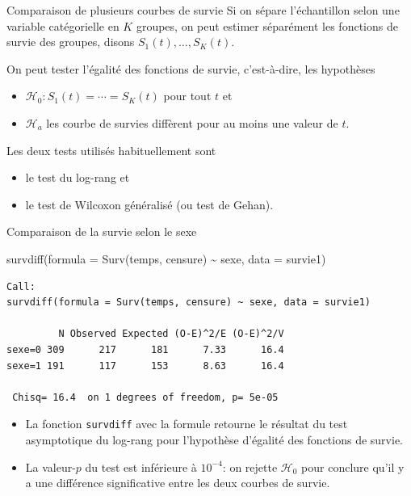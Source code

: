 \documentclass[
  ignorenonframetext,
]{beamer}
\newenvironment{Shaded}{\begin{snugshade}}{\end{snugshade}}
\newcommand{\AttributeTok}[1]{\textcolor[rgb]{0.40,0.45,0.13}{#1}}
\newcommand{\FunctionTok}[1]{\textcolor[rgb]{0.28,0.35,0.67}{#1}}
\newcommand{\NormalTok}[1]{\textcolor[rgb]{0.00,0.23,0.31}{#1}}
\newcommand{\SpecialCharTok}[1]{\textcolor[rgb]{0.37,0.37,0.37}{#1}}
\providecommand{\tightlist}{%
  \setlength{\itemsep}{0pt}\setlength{\parskip}{0pt}}\usepackage{longtable,booktabs,array}
\begin{document}
\begin{frame}{Comparaison de plusieurs courbes de survie}
\protect\hypertarget{comparaison-de-plusieurs-courbes-de-survie}{}
Si on sépare l'échantillon selon une variable catégorielle en \(K\)
groupes, on peut estimer séparément les fonctions de survie des groupes,
disons \(S_1(t), \ldots, S_K(t)\).

On peut tester l'égalité des fonctions de survie, c'est-à-dire, les
hypothèses

\begin{itemize}
\tightlist
\item
  \(\mathscr{H}_0: S_1(t) = \cdots = S_K(t)\) pour tout \(t\) et
\item
  \(\mathscr{H}_a\) les courbe de survies diffèrent pour au moins une
  valeur de \(t\).
\end{itemize}

Les deux tests utilisés habituellement sont

\begin{itemize}
\tightlist
\item
  le test du log-rang et
\item
  le test de Wilcoxon généralisé (ou test de Gehan).
\end{itemize}
\end{frame}

\begin{frame}[fragile]{Comparaison de la survie selon le sexe}
\protect\hypertarget{comparaison-de-la-survie-selon-le-sexe}{}
\begin{Shaded}
\begin{Highlighting}[numbers=left,,]
\FunctionTok{survdiff}\NormalTok{(}\AttributeTok{formula =} \FunctionTok{Surv}\NormalTok{(temps, censure) }\SpecialCharTok{\textasciitilde{}}\NormalTok{ sexe, }
         \AttributeTok{data =}\NormalTok{ survie1)}
\end{Highlighting}
\end{Shaded}

\begin{verbatim}
Call:
survdiff(formula = Surv(temps, censure) ~ sexe, data = survie1)

         N Observed Expected (O-E)^2/E (O-E)^2/V
sexe=0 309      217      181      7.33      16.4
sexe=1 191      117      153      8.63      16.4

 Chisq= 16.4  on 1 degrees of freedom, p= 5e-05 
\end{verbatim}

\begin{itemize}
\tightlist
\item
  La fonction \texttt{survdiff} avec la formule retourne le résultat du
  test asymptotique du log-rang pour l'hypothèse d'égalité des fonctions
  de survie.
\item
  La valeur-\(p\) du test est inférieure à \(10^{-4}\): on rejette
  \(\mathscr{H}_0\) pour conclure qu'il y a une différence significative
  entre les deux courbes de survie.
\end{itemize}
\end{frame}
\end{document}
